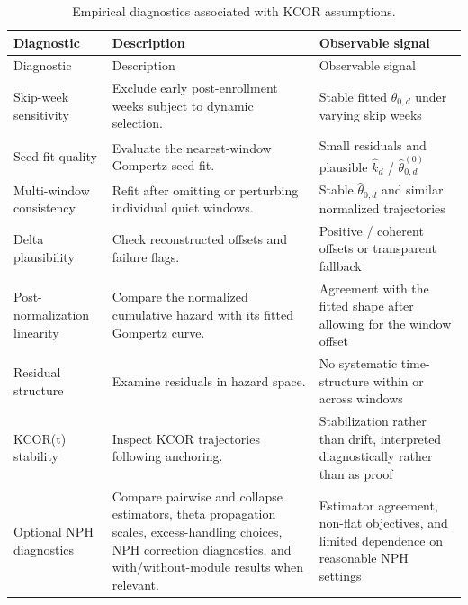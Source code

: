 \documentclass[
]{article}
\begin{document}
\begin{longtable}[]{@{}
  >{\raggedright\arraybackslash}p{}
  >{\raggedright\arraybackslash}p{}
  >{\raggedright\arraybackslash}p{}@{}}
\caption{Empirical diagnostics associated with KCOR assumptions.}\label{tbl:si_diagnostics}\tabularnewline
\toprule\noalign{}
\begin{minipage}[b]{\linewidth}\raggedright
Diagnostic
\end{minipage} & \begin{minipage}[b]{\linewidth}\raggedright
Description
\end{minipage} & \begin{minipage}[b]{\linewidth}\raggedright
Observable signal
\end{minipage} \\
\midrule\noalign{}
\endfirsthead
\toprule\noalign{}
\begin{minipage}[b]{\linewidth}\raggedright
Diagnostic
\end{minipage} & \begin{minipage}[b]{\linewidth}\raggedright
Description
\end{minipage} & \begin{minipage}[b]{\linewidth}\raggedright
Observable signal
\end{minipage} \\
\midrule\noalign{}
\endhead
\bottomrule\noalign{}
\endlastfoot
Skip-week sensitivity & Exclude early post-enrollment weeks subject to dynamic selection. & Stable fitted \(\theta_{0,d}\) under varying skip weeks \\
Seed-fit quality & Evaluate the nearest-window Gompertz seed fit. & Small residuals and plausible \(\hat{k}_d\) / \(\hat{\theta}_{0,d}^{(0)}\) \\
Multi-window consistency & Refit after omitting or perturbing individual quiet windows. & Stable \(\hat{\theta}_{0,d}\) and similar normalized trajectories \\
Delta plausibility & Check reconstructed offsets and failure flags. & Positive / coherent offsets or transparent fallback \\
Post-normalization linearity & Compare the normalized cumulative hazard with its fitted Gompertz curve. & Agreement with the fitted shape after allowing for the window offset \\
Residual structure & Examine residuals in hazard space. & No systematic time-structure within or across windows \\
KCOR(t) stability & Inspect KCOR trajectories following anchoring. & Stabilization rather than drift, interpreted diagnostically rather than as proof \\
Optional NPH diagnostics & Compare pairwise and collapse estimators, theta propagation scales, excess-handling choices, NPH correction diagnostics, and with/without-module results when relevant. & Estimator agreement, non-flat objectives, and limited dependence on reasonable NPH settings \\
\end{longtable}
\end{document}
